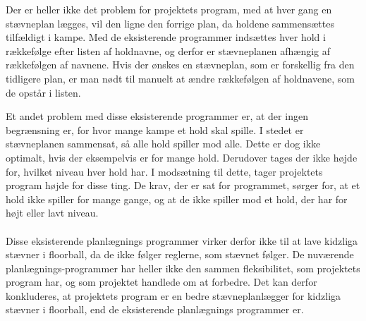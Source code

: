 \par
Der er heller ikke det problem for projektets program, med at hver gang en stævneplan lægges, vil den ligne den forrige plan, da holdene sammensættes tilfældigt i kampe. Med de eksisterende programmer indsættes hver hold i rækkefølge efter listen af holdnavne, og derfor er stævneplanen afhængig af rækkefølgen af navnene. Hvis der ønskes en stævneplan, som er forskellig fra den tidligere plan, er man nødt til manuelt at ændre rækkefølgen af holdnavene, som de opstår i listen.
\par
Et andet problem med disse eksisterende programmer er, at der ingen begrænsning er, for hvor mange kampe et hold skal spille. I stedet er stævneplanen sammensat, så alle hold spiller mod alle. Dette er dog ikke optimalt, hvis der eksempelvis er for mange hold. Derudover tages der ikke højde for, hvilket niveau hver hold har. I modsætning til dette, tager projektets program højde for disse ting. De krav, der er sat for programmet, sørger for, at et hold ikke spiller for mange gange, og at de ikke spiller mod et hold, der har for højt eller lavt niveau.
\\\\
Disse eksisterende planlægnings programmer virker derfor ikke til at lave kidzliga stævner i floorball, da de ikke følger reglerne, som stævnet følger. De nuværende planlægnings-programmer har heller ikke den sammen fleksibilitet, som projektets program har, og som projektet handlede om at forbedre. Det kan derfor konkluderes, at projektets program er en bedre stævneplanlægger for kidzliga stævner i floorball, end de eksisterende planlægnings programmer er.  

